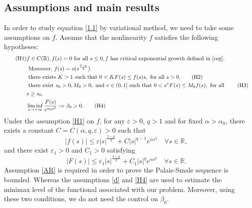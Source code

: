 \documentclass[11pt]{amsart}
\numberwithin{equation}{section}
\newcommand{\R}{\mathbb{R}}
\newcommand{\1}{\frac{1}{2}}
\begin{document}
	
	\subsection{Assumptions and main results} In order to study equation \eqref{1.1} by variational method, we need to take some assumptions on $f$. Assume that the nonlinearity $f$ satisfies the following hypotheses:
	\begin{align} 
		\label{H1} \tag{H1} 
		&f\in C(\R), f(s)=0 \text{ for all } s\leq 0, f \text{ has critical exponential growth defined in \eqref{ceg}. }  \\
		&\text{  Moreover, } f(s)= o(s^{\frac{2 - \mu}{2}}). \nonumber\\
		&\text{ there exists }  K > 1 \text{ such that }  0< K F(s) \leq f(s) s , \text{ for all } s >0. \label{AR} \tag{H2}\\
		&\text{ there exist }  s_0 > 0 ,  M_0 > 0, \text{ and }  v \in (0, 1] \text{ such that }  0 < s^v F(s) \leq M_0 f(s),\text{ for all }\label{d} \tag{H3}\\ 
		&  s \geq s_0 .\nonumber\\
		&\liminf_{s\rightarrow + \infty} \frac{F(s)}{e^{\alpha_0s^2}} := \beta_0 >0. \tag{H4} \label{H4} 
	\end{align}
	Under the assumption \eqref{H1} on $f$, for any $\varepsilon>0$, $q > 1$ and for fixed $\alpha > \alpha_0$, there exists a constant $C=C(\alpha, q, \varepsilon)>0$ such that
	\begin{equation}
		\label{3.1}
		|f(s)| \leq \varepsilon |s|^{\frac{2 - \mu}{2}} + C|s|^{q-1}e^{\alpha s^2}  \quad \forall s \in \mathbb{R}, 
	\end{equation}
	and there exist $\varepsilon_1>0$ and $C_1 >0$ satisfying
	\begin{equation}
		\label{3.2}
		|F(s)| \leq \varepsilon_1 |s|^{\frac{4 - \mu}{2}} + C_1|s|^q e^{\alpha s^2}  \quad \forall s \in \mathbb{R}.
	\end{equation}
	Assumption \eqref{AR} is required in order to prove the Palais-Smale sequence is bounded. Whereas the assumptions \eqref{d} and \eqref{H4} are used to estimate the minimax level of the functional associated with our problem. Moreover, using these two conditions, we do not need the control on $\beta_0$.
	
\end{document}
